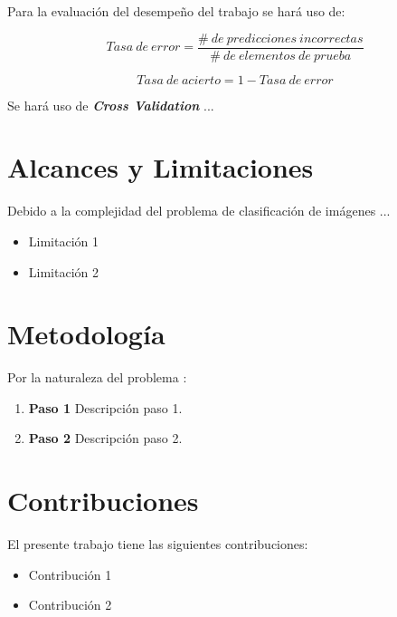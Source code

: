 Para la evaluación del desempeño del trabajo se hará uso de:

\begin{equation}
\label{equation:acierto}
Tasa~de~error = \frac{\#~de~predicciones~incorrectas}{\#~de~elementos~de~prueba}
\end{equation}

\begin{equation}
\label{equation:error}
Tasa~de~acierto = 1 - Tasa~de~error
\end{equation}

Se hará uso de \textbf{\emph{Cross Validation}} ...

\section{Alcances y Limitaciones}
\label{sec:alcances}
Debido a la complejidad del problema de clasificación de imágenes ...
\begin{itemize}
\item Limitación 1
\item Limitación 2
\end{itemize}

\section{Metodología}
Por la naturaleza del problema :
\begin{enumerate}
\item \textbf{Paso 1} Descripción paso 1.
\item \textbf{Paso 2} Descripción paso 2.
\end{enumerate}

\section{Contribuciones}
El presente trabajo tiene las siguientes contribuciones:
   \begin{itemize}
   \item Contribución 1
   \item Contribución 2
   \end{itemize}

